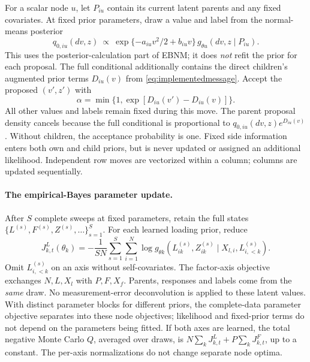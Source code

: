 For a scalar node \(u\), let \(P_{iu}\) contain its current latent parents
and any fixed covariates. At fixed prior parameters, draw a value and label
from the normal-means posterior
\begin{equation}
q_{0,iu}(dv,z)\ \propto\
\exp\{-a_{iu}v^2/2+b_{iu}v\}\,
g_{\theta u}(dv,z\mid P_{iu}).
\label{eq:algorithmproposal}
\end{equation}
This uses the posterior-calculation part of EBNM; it does \emph{not} refit
the prior for each proposal. The full conditional additionally contains
the direct children's augmented prior terms \(D_{iu}(v)\) from
\eqref{eq:implementedmessage}. Accept the proposed \((v',z')\) with
\begin{equation}
\alpha=\min\{1,\exp[D_{iu}(v')-D_{iu}(v)]\}.
\label{eq:algorithmcorrection}
\end{equation}
All other values and labels remain fixed during this move. The parent
proposal density cancels because the full conditional is proportional to
\(q_{0,iu}(dv,z)e^{D_{iu}(v)}\). Without children, the acceptance probability
is one. Fixed side information enters both own and child priors, but is
never updated or assigned an additional likelihood. Independent row moves
are vectorized within a column; columns are updated sequentially.

\paragraph{The empirical-Bayes parameter update.}
After \(S\) complete sweeps at fixed parameters, retain the full states
\(\{L^{(s)},F^{(s)},Z^{(s)},\ldots\}_{s=1}^S\). For each learned loading
prior, reduce
\begin{equation}
J^L_{k,t}(\theta_k)=-\frac{1}{SN}\sum_{s=1}^S\sum_{i=1}^N
\log g_{\theta k}\!\left(L_{ik}^{(s)},Z_{ik}^{(s)}
\mid X_{l,i},L_{i,<k}^{(s)}\right).
\label{eq:algorithmlearningloss}
\end{equation}
Omit \(L_{i,<k}^{(s)}\) on an axis without self-covariates. The factor-axis
objective exchanges \(N,L,X_l\) with \(P,F,X_f\). Parents, responses and
labels come from the \emph{same} draw. No measurement-error deconvolution is
applied to these latent values. With distinct parameter blocks for different
priors, the complete-data parameter objective separates into these node
objectives; likelihood and fixed-prior terms do not depend on the parameters
being fitted. If both axes are learned, the total negative Monte Carlo
\(Q\), averaged over draws, is
\(N\sum_kJ^L_{k,t}+P\sum_kJ^F_{k,t}\), up to a constant.
The per-axis normalizations do not change separate node optima.

